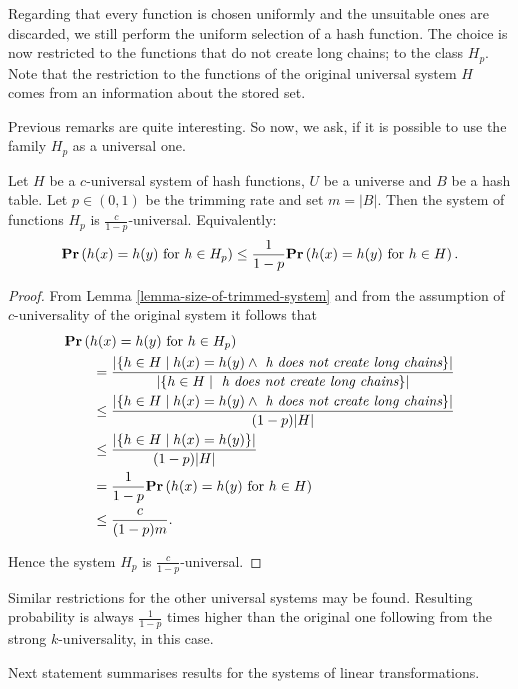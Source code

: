 Regarding that every function is chosen uniformly and the unsuitable ones are discarded, we still perform the uniform selection of a hash function. The choice is now restricted to the functions that do not create long chains; to the class $H_p$. Note that the restriction to the functions of the original universal system $H$ comes from an information about the stored set.

Previous remarks are quite interesting. So now, we ask, if it is possible to use the family $H_p$ as a universal one.
\begin{theorem}
\label{theorem-p-trimmed-is-universal}
Let $H$ be a $c$-universal system of hash functions, $U$ be a universe and $B$ be a hash table. Let $p \in (0, 1)$ be the trimming rate and set $m = |B|$. Then the system of functions $H_p$ is $\frac{c}{1 - p}$-universal. Equivalently:
\[
	\mathbf{Pr}\left(h(x) = h(y) \text{ for } h \in H_p\right) \leq \frac{1}{1 - p} \mathbf{Pr}\left(h(x) = h(y) \text{ for } h \in H\right) \text{.}
\]
\end{theorem}
\begin{proof}
From Lemma \ref{lemma-size-of-trimmed-system} and from the assumption of $c$-universality of the original system it follows that 
\[
\begin{split}
& \mathbf{Pr}\left(h(x) = h(y) \text{ for } h \in H_p\right)  \\
	& \qquad =  \frac{|\{ h \in H \mid h(x) = h(y) \wedge \textit{ h does not create long chains} \}|}{|\lbrace h \in H \mid \textit{ h does not create long chains} \rbrace|} \\
	& \qquad \leq \frac{|\{ h \in H \mid h(x) = h(y) \wedge \textit{ h does not create long chains} \}|}{(1 - p)|H|} \\ 
	& \qquad \leq \frac{|\{ h \in H \mid h(x) = h(y) \}|}{(1 - p)|H|} \\
	& \qquad = \frac{1}{1 - p} \mathbf{Pr}\left(h(x) = h(y) \text{ for } h \in H\right) \\
	& \qquad \leq \frac{c}{(1 - p) m} \text{.}
\end{split}
\]

Hence the system $H_p$ is $\frac{c}{1 - p}$-universal.
\end{proof}

Similar restrictions for the other universal systems may be found. Resulting probability is always $\frac{1}{1 - p}$ times higher than the original one following from the strong $k$-universality, in this case.

Next statement summarises results for the systems of linear transformations.

